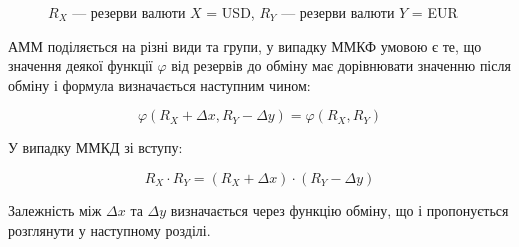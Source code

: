 \documentclass[../index.tex]{subfiles}
\begin{document}
\begin{figure}[ht]
  \centering
  \quad
  \caption{\label{fig:amm-exchange} $R_{X}$ --- резерви валюти $X$ = USD, $R_{Y}$ ---
    резерви валюти $Y$ = EUR}
\end{figure}

АММ поділяється на різні види та групи, у випадку ММКФ умовою є те, що значення
деякої функції $\varphi$ від резервів до обміну має дорівнювати значенню після обміну
і формула визначається наступним чином:

\begin{equation*}
\varphi(R_{X} + \Delta x, R_{Y} - \Delta y) = \varphi(R_{X}, R_{Y})
\end{equation*}

У випадку ММКД зі вступу:

\begin{equation*}
R_{X} \cdot R_{Y} = (R_{X} + \Delta x) \cdot (R_{Y} - \Delta y)
\end{equation*}

Залежність між $\Delta x$ та $\Delta y$ визначається через функцію обміну, що і
пропонується розглянути у наступному розділі.
\end{document}
